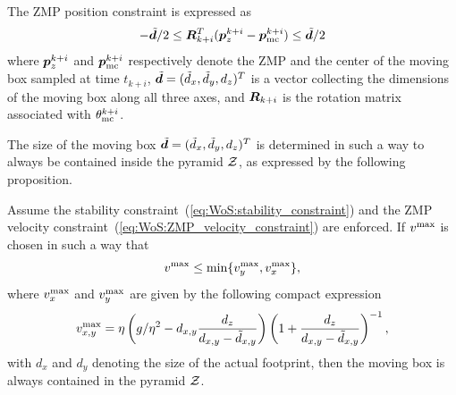 The ZMP position constraint is expressed as
\begin{equation}\label{eq:WoS:ZMP_constraint}
-\tilde{{\bm{d}}} /2 \le {\bm{R}}_{k+i}^T({\bm{p}}_z^{k+i} - {\bm{p}}_{\rm mc}^{k+i}) \le \tilde{{\bm{d}}} /2
\end{equation}
where ${\bm{p}}_z^{k+i}$ and ${\bm{p}}_{\rm mc}^{k+i}$ respectively denote the ZMP and the center of the moving box sampled at time $t_{k+i}$, $\tilde {{\bm{d}}} = (\tilde d_x, \tilde d_y, d_z)^T$
is a vector collecting the dimensions of the moving box along all three axes, and ${\bm{R}}_{k+i}$ is the rotation matrix associated with $\theta_{\rm mc}^{k+i}$.

The size of the moving box $\tilde {{\bm{d}}} = (\tilde d_x, \tilde d_y, d_z)^T$ is determined in such a way to always be contained inside the pyramid $\cal Z$, as expressed by the following proposition.

\medskip

\begin{proposition}
Assume the stability constraint~(\ref{eq:WoS:stability_constraint}) and the ZMP velocity constraint~(\ref{eq:WoS:ZMP_velocity_constraint}) are enforced. If $v^{\rm max}$ is chosen in such a way that
\begin{equation}
v^{\rm max} \le \min \{v_y^{\rm max},v_x^{\rm max}\},
\end{equation}
where $v_x^{\rm max}$ and $v_y^{\rm max}$ are given by the following compact expression
\begin{equation}\label{eq:WoS:conservative_condition}
v_{x,y}^{\rm max} = \eta\left(g/\eta^2 - d_{x,y}\frac{d_z}{d_{x,y} - \tilde d_{x,y}}\right)\left(1 + \frac{d_z}{d_{x,y} - \tilde d_{x,y}}\right)^{-1},
\end{equation}
with $d_x$ and $d_y$ denoting the size of the actual footprint, then the moving box is always contained in the pyramid $\cal Z$.
\label{prop:conservative-box}
\end{proposition}

\medskip


